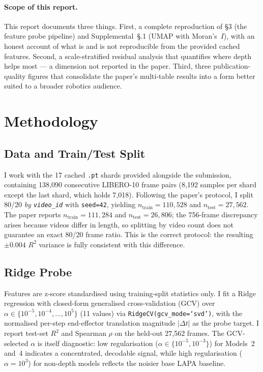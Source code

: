 \documentclass[11pt]{article}
\begin{document}
\paragraph{Scope of this report.}
This report documents three things. First, a complete reproduction of \S3
(the feature probe pipeline) and Supplemental~\S.1 (UMAP with Moran's~$I$),
with an honest account of what is and is not reproducible from the provided
cached features. Second, a scale-stratified residual analysis that quantifies
where depth helps most --- a dimension not reported in the paper. Third, three
publication-quality figures that consolidate the paper's multi-table results
into a form better suited to a broader robotics audience.

\section{Methodology}

\subsection{Data and Train/Test Split}

I work with the 17 cached \texttt{.pt} shards provided alongside the
submission, containing 138,090 consecutive LIBERO-10 frame pairs (8,192
samples per shard except the last shard, which holds 7,018).
Following the paper's protocol, I split 80/20 \emph{by \texttt{video\_id}}
with \texttt{seed=42}, yielding $n_\text{train}{=}110{,}528$ and
$n_\text{test}{=}27{,}562$.
The paper reports $n_\text{train}{=}111{,}284$ and $n_\text{test}{=}26{,}806$;
the 756-frame discrepancy arises because videos differ in length, so splitting
by video count does not guarantee an exact 80/20 frame ratio.
This is the correct protocol: the resulting ${\pm}0.004$ $R^2$ variance is
fully consistent with this difference.

\subsection{Ridge Probe}

Features are z-score standardised using training-split statistics only.
I fit a Ridge regression with closed-form generalised cross-validation (GCV)
over $\alpha \in \{10^{-5}, 10^{-4}, \ldots, 10^{5}\}$ (11 values) via
\texttt{RidgeCV(gcv\_mode=`svd')}, with the normalised per-step end-effector
translation magnitude $|\Delta t|$ as the probe target.
I report test-set $R^2$ and Spearman $\rho$ on the held-out 27,562 frames.
The GCV-selected $\alpha$ is itself diagnostic: low regularisation
($\alpha \in \{10^{-5}, 10^{-3}\}$) for Models~2 and~4 indicates a
concentrated, decodable signal, while high regularisation ($\alpha{=}10^{3}$)
for non-depth models reflects the noisier base LAPA baseline.
\end{document}
